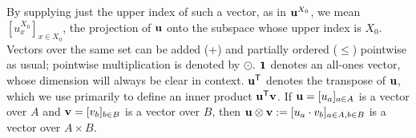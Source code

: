 \documentclass[twoside]{article}
\begin{document}
By supplying just the upper index of such a vector, as in $\mathbf{u}^{X_0}$,
we mean $[u^{X_0}_x]_{x \in {X_0}}$, the projection of $\mathbf{u}$ onto the subspace whose upper index is $X_0$. 
Vectors over the same set can be added (+) and partially ordered
($\le$) pointwise as usual; pointwise multiplication is denoted by
$\odot$.   
$\mathbf{1}$ denotes an all-ones vector, whose dimension will always be clear in context.
$\mathbf{u}^{\sf T}$ denotes the transpose of $\mathbf{u}$, which we use
primarily to define an inner product $\mathbf{u}^{\sf T} \mathbf{v}$. 
If $\mathbf{u} = [u_a]_{a \in A}$ is a vector over $A$ and $\mathbf{v} = [v_b]_{b \in B}$ is a vector over $B$, then $\mathbf{u} \mathbin{\otimes} \mathbf{v} := [ u_a \cdot v_b ]_{a \in A, b \in B}$ is a vector over $A \times B$.

\end{document}
